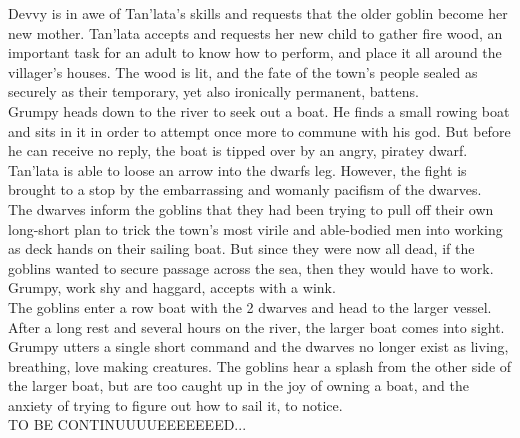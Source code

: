 Devvy is in awe of Tan’lata’s skills and requests that the older goblin become her new mother. Tan’lata accepts and requests her new child to gather fire wood, an important task for an adult to know how to perform, and place it all around the villager’s houses. The wood is lit, and the fate of the town’s people sealed as securely as their temporary, yet also ironically permanent, battens.\\
Grumpy heads down to the river to seek out a boat. He finds a small rowing boat and sits in it in order to attempt once more to commune with his god. But before he can receive no reply, the boat is tipped over by an angry, piratey dwarf. Tan’lata is able to loose an arrow into the dwarfs leg. However, the fight is brought to a stop by the embarrassing and womanly pacifism of the dwarves.\\
The dwarves inform the goblins that they had been trying to pull off their own long-short plan to trick the town’s most virile and able-bodied men into working as deck hands on their sailing boat. But since they were now all dead, if the goblins wanted to secure passage across the sea, then they would have to work. Grumpy, work shy and haggard, accepts with a wink.\\
The goblins enter a row boat with the 2 dwarves and head to the larger vessel. After a long rest and several hours on the river, the larger boat comes into sight. Grumpy utters a single short command and the dwarves no longer exist as living, breathing, love making creatures. The goblins hear a splash from the other side of the larger boat, but are too caught up in the joy of owning a boat, and the anxiety of trying to figure out how to sail it, to notice.\\
TO BE CONTINUUUUEEEEEEED...